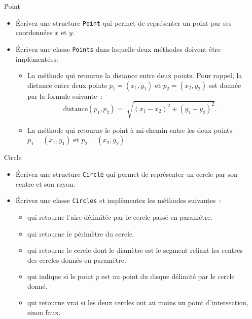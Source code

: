 \documentclass[a4paper,11pt]{article}
\begin{document}
	\begin{Exercice}{Point}
		\begin{itemize}
			\item
				Écrivez une structure \texttt{Point} qui permet de représenter un point par ses coordonnées $x$ et $y$.
			\item 
				Écrivez une classe \texttt{Points} dans laquelle deux méthodes doivent être implémentées:
				\begin{itemize}
					\item 
						La méthode  qui retourne la distance entre deux points. Pour rappel, la distance entre deux points $p_1 = (x_1, y_1)$ et $p_2 = (x_2, y_2)$ est donnée par la formule suivante~:
						\[
							\textrm{distance}(p_1, p_2) = \sqrt[]{(x_1 - x_2)^2 + (y_1 - y_2)^2}.
						\]
					\item 
						La méthode  qui retourne le point à mi-chemin entre les deux points $p_1 = (x_1, y_1)$ et $p_2 = (x_2, y_2)$.
				\end{itemize}
		\end{itemize}		
	\end{Exercice}

	\begin{Exercice}{Circle}
		\begin{itemize}
			\item
				Écrivez une structure \texttt{Circle} qui permet de représenter un cercle par son centre et son rayon.
			\item
				Écrivez une classe \texttt{Circles} et implémentez les méthodes suivantes~:
				\begin{itemize}
					\item 
						 qui retourne l'aire délimitée par le cercle passé en paramètre.
					\item
						 qui retourne le périmètre du cercle.
					\item  
						 qui retourne le cercle dont le diamètre est le segment reliant les centres des cercles donnés en paramètre.
					\item  
						 qui indique si le point $p$ est un point du disque délimité par le cercle donné.
					\item  
						 qui retourne vrai si les deux cercles ont au moins un point d'intersection, sinon faux.
				\end{itemize}
		\end{itemize}		
	\end{Exercice}
\end{document}
